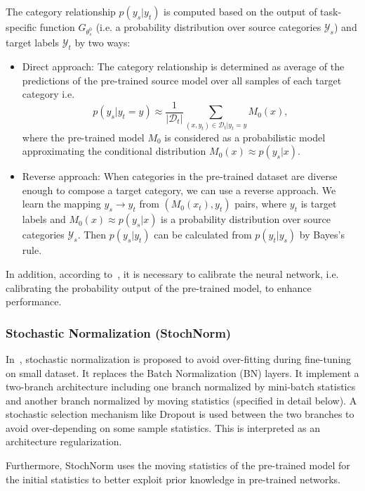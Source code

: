\documentclass[journal]{IEEEtran}
\begin{document}
The category relationship $p(y_s|y_t)$ is computed based on the output of task-specific function $G_{\theta^0_s}$ (i.e. a probability distribution over source categories $\mathcal{Y}_s$) and target labels $\mathcal{Y}_t$ by two ways: 
\begin{itemize}
	\item Direct approach: The category relationship is determined as average of the predictions of the pre-trained source model over all samples of each target category i.e.
\begin{equation}\label{directpysyt}
    p(y_s|y_t=y)\approx \frac{1}{|\mathcal{D}_t|}\sum_{ (x, y_t) \in \mathcal{D}_t|y_t=y } {M_0(x)},
\end{equation}
where the pre-trained model $M_0$ is considered as a probabilistic model approximating the conditional distribution $M_0(x)\approx p(y_s|x)$. 

\item Reverse approach: When categories in the pre-trained dataset are diverse enough to compose a target category, we can use a reverse approach. We learn the mapping $y_s \rightarrow  y_t$ from $(M_0(x_t), y_t)$ pairs, where $y_t$ is target labels and $M_0(x)\approx p(y_s|x)$ is a probability distribution over source categories $\mathcal{Y}_s$. Then $p(y_s|y_t)$ can be calculated from $p(y_t|y_s)$ by Bayes's rule.

\end{itemize}

In addition, according to~\cite{you2020co}, it is necessary to calibrate the neural network, i.e. calibrating the probability output of the pre-trained model, to enhance performance.


\subsubsection{Stochastic Normalization (StochNorm)}
In~\cite{kou2020stochastic}, stochastic normalization is proposed to avoid over-fitting during fine-tuning on small dataset. It replaces the Batch Normalization (BN) layers. It implement a two-branch architecture including one branch normalized by mini-batch statistics and another branch normalized by moving statistics (specified in detail below). 
A stochastic selection mechanism like Dropout is used between the two branches to avoid over-depending on some sample statistics. This is interpreted as an architecture regularization. 

Furthermore, StochNorm uses the moving statistics of the pre-trained model for the initial statistics to better exploit prior knowledge in pre-trained networks.
\end{document}
